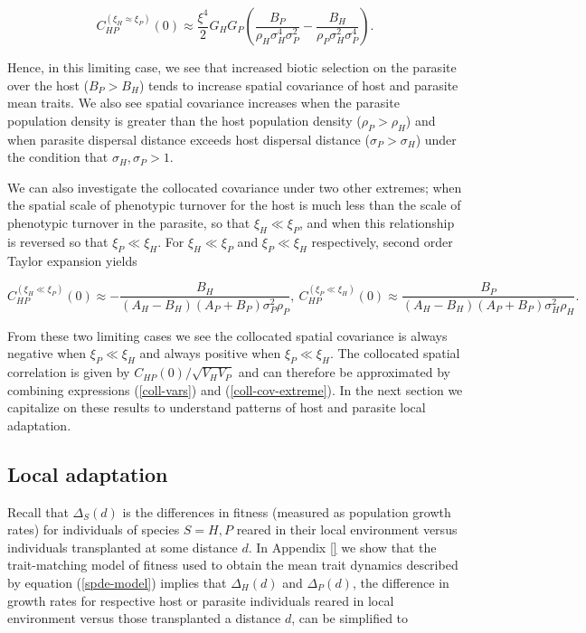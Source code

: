 \documentclass{article}
\begin{document}
\begin{equation}
  C_{HP}^{(\xi_H\approx\xi_P)}(0)\approx \frac{\xi^4}{2}G_HG_P\left(\frac{B_P}{\rho_H\sigma_H^4\sigma_P^2}-\frac{B_H}{\rho_P\sigma_H^2\sigma_P^4}\right).
\end{equation}

Hence, in this limiting case, we see that increased biotic selection on
the parasite over the host (\(B_P>B_H\)) tends to increase spatial
covariance of host and parasite mean traits. We also see spatial
covariance increases when the parasite population density is greater
than the host population density (\(\rho_P>\rho_H\)) and when parasite
dispersal distance exceeds host dispersal distance
(\(\sigma_P>\sigma_H\)) under the condition that
\(\sigma_H,\sigma_P>1\).

We can also investigate the collocated covariance under two other
extremes; when the spatial scale of phenotypic turnover for the host is
much less than the scale of phenotypic turnover in the parasite, so that
\(\xi_H\ll\xi_P\), and when this relationship is reversed so that
\(\xi_P\ll\xi_H\). For \(\xi_H\ll\xi_P\) and \(\xi_P\ll\xi_H\)
respectively, second order Taylor expansion yields

\begin{equation}\label{coll-cov-extreme}
  C_{HP}^{(\xi_H\ll\xi_P)}(0)\approx-\frac{B_H}{(A_H-B_H)(A_P+B_P)\sigma_P^2\rho_P}, \ C_{HP}^{(\xi_P\ll\xi_H)}(0)\approx\frac{B_P}{(A_H-B_H)(A_P+B_P)\sigma_H^2\rho_H}.
\end{equation}

From these two limiting cases we see the collocated spatial covariance
is always negative when \(\xi_P\ll\xi_H\) and always positive when
\(\xi_P\ll\xi_H\). The collocated spatial correlation is given by
\(C_{HP}(0)/\sqrt{V_HV_P}\) and can therefore be approximated by
combining expressions (\ref{coll-vars}) and (\ref{coll-cov-extreme}). In
the next section we capitalize on these results to understand patterns
of host and parasite local adaptation.

\hypertarget{local-adaptation}{%
\subsection{Local adaptation}\label{local-adaptation}}

Recall that \(\Delta_S(d)\) is the differences in fitness (measured as
population growth rates) for individuals of species \(S=H,P\) reared in
their local environment versus individuals transplanted at some distance
\(d\). In Appendix \ref{} we show that the trait-matching model of
fitness used to obtain the mean trait dynamics described by equation
(\ref{spde-model}) implies that \(\Delta_H(d)\) and \(\Delta_P(d)\), the
difference in growth rates for respective host or parasite individuals
reared in local environment versus those transplanted a distance \(d\),
can be simplified to
\end{document}
